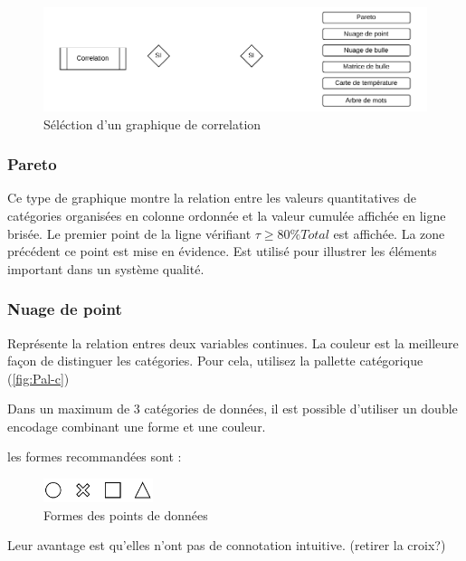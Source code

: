 \documentclass[a4paper,12pt]{article}
\begin{document}
\begin{multicols}{2}
\begin{figure}
\centering
\includegraphics[width=.9\linewidth]{./img/select-correlation.pdf}
\caption{\label{fig:select-corellation}Séléction d'un graphique de correlation}
\end{figure}
\subsubsection*{Pareto}
\label{sec:org9d2dc65}
Ce type de graphique montre la relation entre les valeurs quantitatives de catégories organisées en colonne ordonnée et la valeur cumulée affichée en ligne brisée. Le premier point de la ligne vérifiant \(\tau\geq80\%Total\) est affichée. La zone précédent ce point est mise en évidence.
Est utilisé pour illustrer les éléments important dans un système qualité.
\subsubsection*{Nuage de point}
\label{sec:org0d5b597}

Représente la relation entres deux variables continues. \autocite{alansmithLexiqueVisuel}
La couleur est la meilleure façon de distinguer les catégories.\autocite{stephenfewComponentlevelGraphDesign2012} Pour cela, utilisez la pallette catégorique (\ref{fig:Pal-c})

Dans un maximum de 3 catégories de données, il est possible d'utiliser un double encodage combinant une forme et une couleur.\autocite{andreaskrauseBestPracticesData2024}

les formes recommandées sont :

\begin{figure}[H]
\centering
\includegraphics[width=3.2cm]{./img/formes.pdf}
\caption{\label{fig:formes}Formes des points de données}
\end{figure}

Leur avantage est qu'elles n'ont pas de connotation intuitive.\autocite{andreaskrauseBestPracticesData2024} (retirer la croix?)


\end{multicols}
\end{document}
